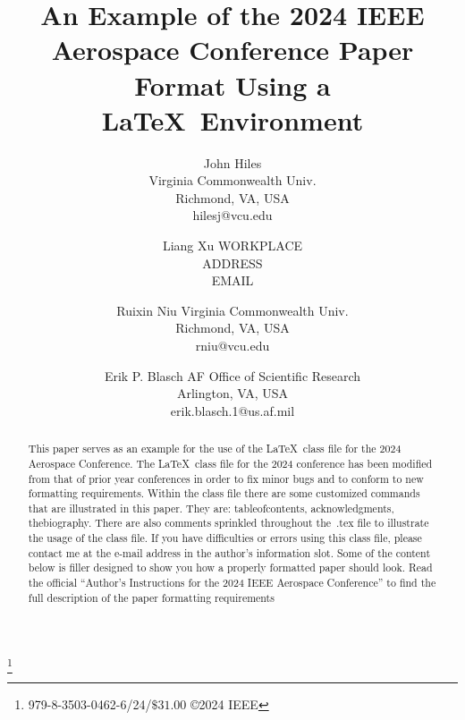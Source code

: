 \documentclass[twocolumn,letterpaper]{IEEEAerospaceCLS}  %
\begin{document}
\title{An Example of the 2024 IEEE Aerospace Conference Paper Format Using a \LaTeX~Environment}


\author{
{John Hiles}\\
Virginia Commonwealth Univ.\\
Richmond, VA,  USA  \\
hilesj@vcu.edu
\and
Liang Xu
WORKPLACE\\
ADDRESS  \\
EMAIL
\and
Ruixin Niu
Virginia Commonwealth Univ.\\
Richmond, VA, USA  \\
rniu@vcu.edu
\and
{Erik P. Blasch}
AF Office of Scientific Research\\
	Arlington, VA, USA  \\
	erik.blasch.1@us.af.mil
}




\thanks{\footnotesize 979-8-3503-0462-6/24/$\$31.00$ \copyright2024 IEEE}              %


\maketitle

\thispagestyle{plain}
\pagestyle{plain}



\maketitle

\thispagestyle{plain}
\pagestyle{plain}

\begin{abstract}
This paper serves as an example for the use of the \LaTeX~class file for the 2024 Aerospace Conference. The \LaTeX~class file for the 2024 conference has been modified from that of prior year conferences in order to fix minor bugs and to conform to new formatting requirements. Within the class file there are some customized commands that are illustrated in this paper. They are: tableofcontents, acknowledgments, thebiography. There are also comments sprinkled throughout the~.tex file to illustrate the usage of the class file. If you have difficulties or errors using this class file, please contact me at the e-mail address in the author's information slot. Some of the content below is filler designed to show you how a properly formatted paper should look. Read the official ``Author's Instructions for the 2024 IEEE Aerospace Conference'' to find the full description of the paper formatting requirements
\end{abstract} 
\end{document}
